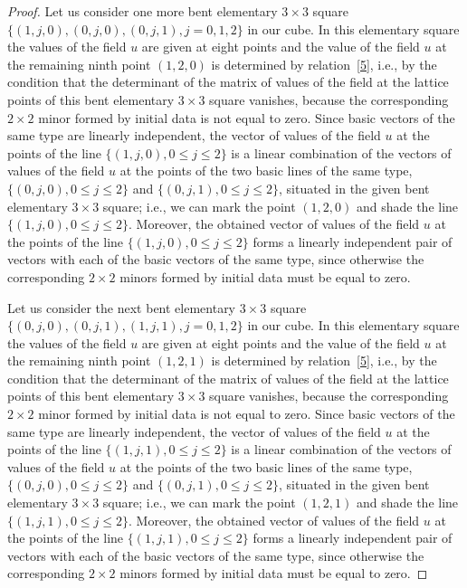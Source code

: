 \documentclass[pdftex]{sigma}
\begin{document}
\begin{proof}
Let us consider one more bent elementary $3 \times 3$ square $\{(1,
j, 0), (0, j, 0), (0, j, 1),  j = 0, 1, 2\}$ in our cube. In this
elementary square the values of the f\/ield $u$ are given at eight
points and the value of the f\/ield $u$ at the remaining ninth point
$(1, 2, 0)$ is determined by relation~\eqref{5}, i.e., by the
condition that the determinant of the matrix of values of the f\/ield
at the lattice points of this bent elementary $3 \times 3$ square
vanishes, because the corresponding $2 \times 2$ minor formed by
initial data is not equal to zero. Since basic vectors of the same
type are linearly independent, the vector of values of the f\/ield $u$
at the points of the line $\{(1, j, 0), 0 \leq j \leq 2\}$ is a
linear combination of the vectors of values of the f\/ield $u$ at the
points of the two basic lines of the same type, $\{(0, j, 0), 0 \leq
j \leq 2\}$ and $\{(0, j, 1), 0 \leq j \leq 2\}$, situated in the
given bent elementary $3 \times 3$ square; i.e., we can mark the
point $(1, 2, 0)$ and shade the line $\{(1, j, 0), 0 \leq j \leq
2\}$. Moreover, the obtained vector of values of the f\/ield $u$ at
the points of the line $\{(1, j, 0), 0 \leq j \leq 2\}$ forms a
linearly independent pair of vectors with each of the basic vectors
of the same type, since otherwise the corresponding $2 \times 2$
minors formed by initial data must be equal to zero.



Let us consider the next bent elementary $3 \times 3$ square $\{(0,
j, 0), (0, j, 1), (1, j, 1), j = 0, 1, 2\}$ in our cube. In this
elementary square the values of the f\/ield $u$ are given at eight
points and the value of the f\/ield $u$ at the remaining ninth point
$(1, 2, 1)$ is determined by relation~\eqref{5}, i.e., by the
condition that the determinant of the matrix of values of the f\/ield
at the lattice points of this bent elementary $3 \times 3$ square
vanishes, because the corresponding $2 \times 2$ minor formed by
initial data is not equal to zero. Since basic vectors of the same
type are linearly independent, the vector of values of the f\/ield $u$
at the points of the line $\{(1, j, 1), 0 \leq j \leq 2\}$ is a
linear combination of the vectors of values of the f\/ield $u$ at the
points of the two basic lines of the same type, $\{(0, j, 0), 0 \leq
j \leq 2\}$ and $\{(0, j, 1), 0 \leq j \leq 2\}$, situated in the
given bent elementary $3 \times 3$ square; i.e., we can mark the
point $(1, 2, 1)$ and shade the line $\{(1, j, 1), 0 \leq j \leq
2\}$. Moreover, the obtained vector of values of the f\/ield $u$ at
the points of the line $\{(1, j, 1), 0 \leq j \leq 2\}$ forms a
linearly independent pair of vectors with each of the basic vectors
of the same type, since otherwise the corresponding $2 \times 2$
minors formed by initial data must be equal to zero.




\end{proof}
\end{document}
